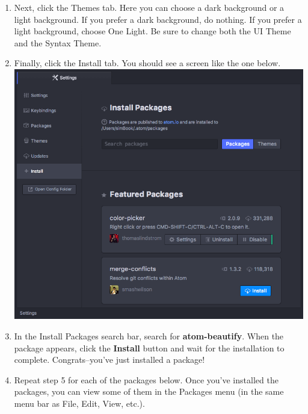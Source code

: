 \documentclass[]{book}
\theoremstyle{definition}
\theoremstyle{definition}
\theoremstyle{definition}
\theoremstyle{remark}
\begin{document}
\begin{enumerate}
\item
  Next, click the Themes tab. Here you can choose a dark background or a
  light background. If you prefer a dark background, do nothing. If you
  prefer a light background, choose One Light. Be sure to change both
  the UI Theme and the Syntax Theme.
\item
  Finally, click the Install tab. You should see a screen like the one
  below.\\
  \includegraphics{packages-install.png}
\item
  In the Install Packages search bar, search for \textbf{atom-beautify}.
  When the package appears, click the \textbf{Install} button and wait
  for the installation to complete. Congrats--you've just installed a
  package!
\item
  Repeat step 5 for each of the packages below. Once you've installed
  the packages, you can view some of them in the Packages menu (in the
  same menu bar as File, Edit, View, etc.).


\end{enumerate}
\end{document}
